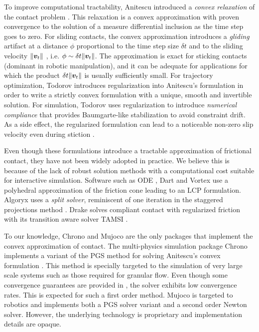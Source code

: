 To improve computational tractability, Anitescu introduced a \textit{convex
relaxation} of the contact problem \cite{bib:anitescu2006}. This relaxation is a
convex approximation with proven convergence to the solution of a measure
differential inclusion as the time step goes to zero. For sliding contacts,
the convex approximation introduces a \emph{gliding} artifact at a distance $\phi$
proportional to the time step size $\delta t$ and to the sliding velocity
$\Vert{\bm{v}}_t\Vert$ \cite{bib:mazhar2014}, i.e. $\phi\sim \delta
t\Vert{\bm{v}}_t\Vert$. The approximation is exact for sticking contacts
(dominant in robotic manipulation),
and it can be adequate for applications for which the product $\delta
t\Vert{\bm{v}}_t\Vert$ is usually sufficiently small. For trajectory optimization,
Todorov \cite{bib:todorov2011} introduces regularization into Anitescu's
formulation in order to write a strictly convex formulation with a unique,
smooth and invertible solution. For simulation, Todorov \cite{bib:todorov2014}
uses regularization to introduce \emph{numerical compliance} that provides
Baumgarte-like stabilization to avoid constraint drift. As a side effect, the
regularized formulation can lead to a noticeable non-zero slip velocity even
during stiction \cite{bib:simbenchmark}.

Even though these formulations introduce a tractable approximation of frictional
contact, they have not been widely adopted in practice. We
believe this is because of the lack of robust solution methods with a
computational cost suitable for interactive simulation. Software such as ODE
\cite{bib:ode}, Dart \cite{bib:dart} and Vortex \cite{bib:vortex} use a
polyhedral approximation of the friction cone leading to an LCP formulation.
Algoryx \cite{bib:algoryx} uses a \emph{split solver}, reminiscent of one
iteration in the staggered projections method \cite{bib:Kaufman2008}. Drake
\cite{bib:drake} solves compliant contact with regularized friction with its
transition aware solver TAMSI \cite{bib:castro2020}. 

To our knowledge, Chrono \cite{bib:hrono2016} and Mujoco
\cite{bib:mujoco} are the only packages that implement the convex approximation
of contact. The multi-physics simulation package Chrono implements a variant of
the PGS method for solving Anitescu's convex formulation \cite{bib:tasora2011}.
This method is specially targeted to the simulation of very large scale systems
such as those required for granular flow. Even though some convergence guarantees are
provided in \cite{bib:anitescu2010}, the solver exhibits low convergence rates.
This is expected for such a first order method. Mujoco is targeted to
robotics and implements both a PGS solver variant \cite{bib:todorov2014} and a
second order Newton solver. However, the underlying technology is proprietary and
implementation details are opaque.

